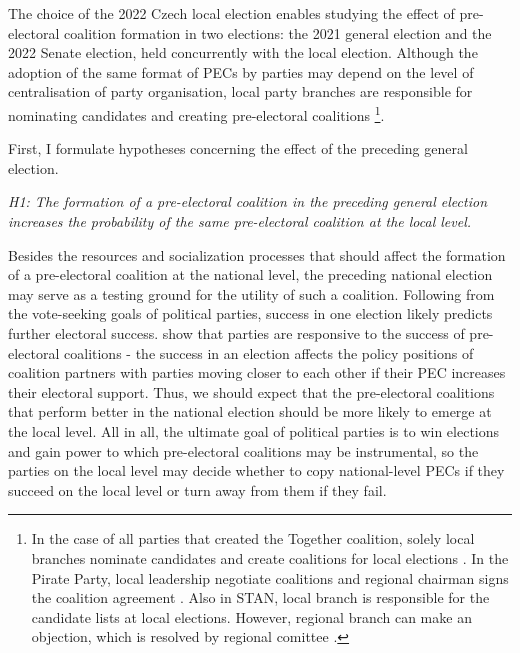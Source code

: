 \documentclass[]{interact}
\theoremstyle{plain}%
\theoremstyle{definition}
\theoremstyle{remark}
\begin{document}
The choice of the 2022 Czech local election enables studying the effect of pre-electoral coalition formation in two elections: the 2021 general election and the 2022 Senate election, held concurrently with the local election. Although the adoption of the same format of PECs by parties may depend on the level of centralisation of party organisation, local party branches are responsible for nominating candidates and creating pre-electoral coalitions \footnote{In the case of all parties that created the Together coalition, solely local branches nominate candidates and create coalitions for local elections \citep{ods, kdu, top09}. In the Pirate Party, local leadership negotiate coalitions and regional chairman signs the coalition agreement \citep{pirati}. Also in STAN, local branch is responsible for the candidate lists at local elections. However, regional branch can make an objection, which is resolved by regional comittee \citep{stan}.}.

First, I formulate hypotheses concerning the effect of the preceding general election.

\vspace{12pt}
\textit{H1: The formation of a pre-electoral coalition in the preceding general election increases the probability of the same pre-electoral coalition at the local level.\label{hyp:1}}
\vspace{12pt}

Besides the resources and socialization processes that should affect the formation of a pre-electoral coalition at the national level, the preceding national election may serve as a testing ground for the utility of such a coalition. Following from the vote-seeking goals of political parties, success in one election likely predicts further electoral success. \citet{greene2017} show that parties are responsive to the success of pre-electoral coalitions - the success in an election affects the policy positions of coalition partners with parties moving closer to each other if their PEC increases their electoral support. Thus, we should expect that the pre-electoral coalitions that perform better in the national election should be more likely to emerge at the local level. All in all, the ultimate goal of political parties is to win elections and gain power to which pre-electoral coalitions may be instrumental, so the parties on the local level may decide whether to copy national-level PECs if they succeed on the local level or turn away from them if they fail.  
\end{document}
